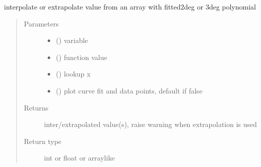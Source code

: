 \documentclass[letterpaper,10pt,english]{sphinxmanual}
\begin{document}
\begin{fulllineitems}
\label{\detokenize{helper_func:helper_func.interp_extrap_f}}
\sphinxAtStartPar
interpolate or extrapolate value from an array with fitted2\sphinxhyphen{}deg or 3\sphinxhyphen{}deg polynomial
\begin{quote}\begin{description}
\item[{Parameters}] \leavevmode\begin{itemize}
\item {} 
\sphinxAtStartPar
{} () \textendash{} variable

\item {} 
\sphinxAtStartPar
{} () \textendash{} function value

\item {} 
\sphinxAtStartPar
{} () \textendash{} look\sphinxhyphen{}up x

\item {} 
\sphinxAtStartPar
{} () \textendash{} plot curve fit and data points, default if false

\end{itemize}

\item[{Returns}] \leavevmode
\sphinxAtStartPar
inter/extrapolated value(s), raise warning when extrapolation is used

\item[{Return type}] \leavevmode
\sphinxAtStartPar
int or float or array\sphinxhyphen{}like

\end{description}\end{quote}

\end{fulllineitems}
\end{document}
